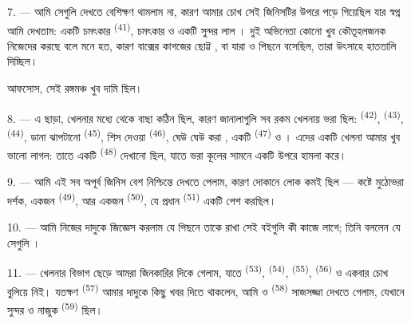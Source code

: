 7. --- আমি সেগুলি দেখতে বেশিক্ষণ থামলাম না, কারণ আমার চোখ সেই জিনিসটির উপরে
পড়ে গিয়েছিল যার স্বপ্ন আমি দেখতাম: একটি চমৎকার 
\textsuperscript{(41)}, চমৎকার  ও একটি সুন্দর লাল
।  দুই অভিনেতা কোনো খুব কৌতূহলজনক
 নিজেদের  করছে বলে মনে হত, কারণ বাক্সের কাগজের
ছোট্ট , বা যারা  ও   পিছনে বসেছিল, তারা উৎসাহে হাততালি দিচ্ছিল।

আফসোস, সেই রঙ্গমঞ্চ খুব দামি ছিল।

8. --- এ ছাড়া, খেলনার মধ্যে থেকে বাছা কঠিন ছিল, কারণ জানালাগুলি সব রকম খেলনায়
ভরা ছিল:  \textsuperscript{(42)}, 
\textsuperscript{(43)},  \textsuperscript{(44)}, ডানা ঝাপটানো
 \textsuperscript{(45)}, শিস দেওয়া 
\textsuperscript{(46)}, ঘেউ ঘেউ করা , একটি 
\textsuperscript{(47)} ও । এদের একটি খেলনা আমার খুব ভালো লাগল:
তাতে একটি  \textsuperscript{(48)} দেখানো ছিল, যাতে
 ভরা কূলের সামনে  একটি 
উপরে হামলা করে।


9. --- আমি এই সব অপূর্ব জিনিস বেশ নিশ্চিন্তে দেখতে পেলাম, কারণ দোকানে লোক কমই
ছিল --- কষ্টে মুঠোভরা দর্শক, একজন 
\textsuperscript{(49)}, আর একজন  \textsuperscript{(50)}, যে
প্রধান  \textsuperscript{(51)} একটি  পেশ করছিল।

10. --- আমি নিজের দাদুকে জিজ্ঞেস করলাম যে  পিছনে তাকে রাখা
সেই বইগুলি কী কাজে লাগে; তিনি বললেন যে সেগুলি ।

\VUsaut{3.6mm}
\VUsaut{2.8mm}

11. --- খেলনার বিভাগ ছেড়ে আমরা জিনকারির দিকে গেলাম, যাতে 
\textsuperscript{(53)},  \textsuperscript{(54)},
 \textsuperscript{(55)},  \textsuperscript{(56)}
ও  একবার চোখ বুলিয়ে নিই। যতক্ষণ  \textsuperscript{(57)} আমার দাদুকে কিছু খবর দিতে থাকলেন, আমি
 ও  \textsuperscript{(58)} সাজসজ্জা দেখতে
গেলাম, যেখানে সুন্দর  ও নাজুক 
\textsuperscript{(59)} ছিল।

